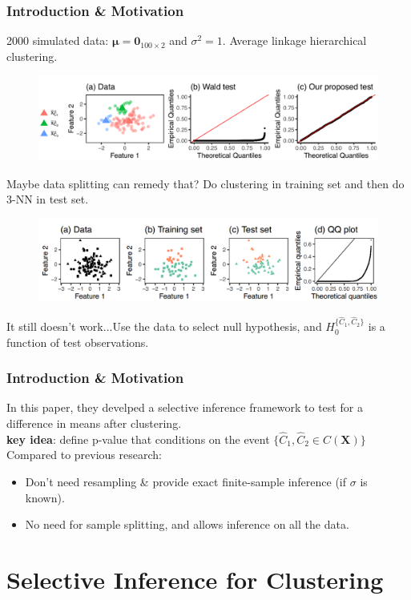 \documentclass{beamer}
\begin{document}
	
	\begin{frame}
		\frametitle{Introduction \& Motivation}
		2000 simulated data: $\mathbf{\mu} = \mathbf{0}_{100\times2}$ and $\sigma^2 = 1$. Average linkage hierarchical clustering.
		\begin{figure}
			\includegraphics[width=0.7\linewidth]{image001.png}
		\end{figure}
		Maybe data splitting can remedy that? Do clustering in training set and then do 3-NN in test set.
		\begin{figure}
			\includegraphics[width=0.7\linewidth]{image002.png}
		\end{figure}
		It still doesn't work...Use the data to select null hypothesis, and $H_0^{\{\hat{C}_1, \hat{C}_2\}}$ is a function of test observations.
	\end{frame}
	
	\begin{frame}
		\frametitle{Introduction \& Motivation}
		In this paper, they develped a selective inference framework to test for a difference in means after clustering.\\
		\textbf{key idea}: define p-value that conditions on the event $\{\hat{C}_1, \hat{C}_2 \in C(\bm{X})\}$\\
		Compared to previous research:
		\begin{itemize}
			\item
			Don't need resampling \& provide exact finite-sample inference (if $\sigma$ is known).
			\item
			No need for sample splitting, and allows inference on all the data. 
		\end{itemize}
	\end{frame} 
	
	\section{Selective Inference for Clustering}
	
\end{document}
